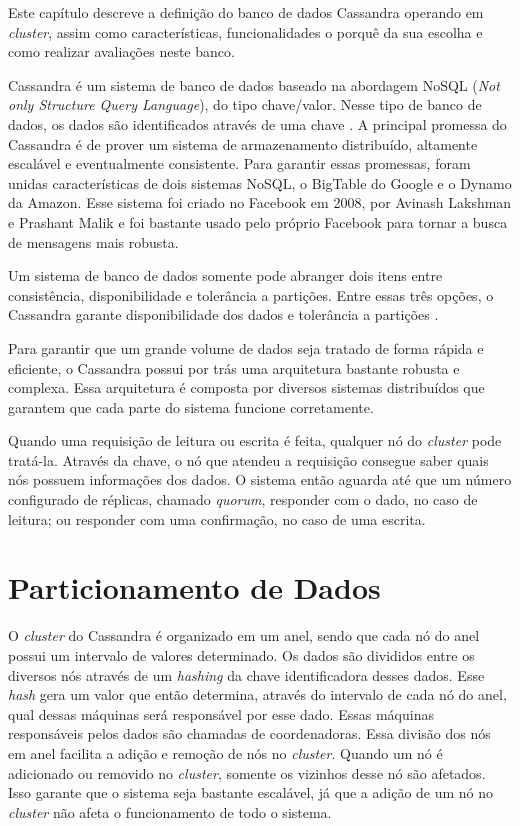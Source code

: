 Este capítulo descreve a definição do banco de dados Cassandra operando em \textit{cluster}, assim como características, funcionalidades o porquê da sua escolha e como realizar avaliações neste banco. 

Cassandra é um sistema de banco de dados baseado na abordagem NoSQL (\textit{Not only Structure Query Language}), do tipo chave/valor. Nesse tipo de banco de dados, os dados são identificados através de uma chave \cite{Silva}.
A principal promessa do Cassandra é de prover um sistema de armazenamento distribuído, altamente escalável e eventualmente consistente. Para garantir essas promessas,
foram unidas características de dois sistemas NoSQL, o BigTable do Google e o Dynamo da Amazon.
Esse sistema foi criado no Facebook em 2008, por Avinash Lakshman e Prashant Malik e foi bastante usado pelo próprio Facebook para tornar a busca de mensagens mais robusta. 


Um sistema de banco de dados somente pode abranger dois itens entre consistência, disponibilidade e tolerância a partições. Entre essas três
opções, o Cassandra garante disponibilidade dos dados e tolerância a partições \cite{Silva}.

Para garantir que um grande volume de dados seja tratado de forma rápida e eficiente, o Cassandra possui por trás uma arquitetura bastante robusta e complexa. Essa arquitetura é composta por diversos sistemas distribuídos que garantem que cada parte do sistema funcione corretamente.

Quando uma requisição de leitura ou escrita é feita, qualquer nó do \textit{cluster} pode tratá-la. Através da chave, o nó que atendeu a requisição consegue saber quais nós possuem informações dos dados. O sistema então aguarda até que um número configurado de réplicas, chamado \textit{quorum}, responder com o dado, no caso de leitura; ou responder com uma confirmação, no caso de uma escrita.

\section{Particionamento de Dados}
O \textit{cluster} do Cassandra é organizado em um anel, sendo que cada nó do anel possui um intervalo de valores determinado. Os dados são divididos entre os diversos nós através de um \textit{hashing} da chave identificadora desses dados. Esse \textit{hash} gera um valor que então determina, através do intervalo de cada nó do anel, qual dessas máquinas será responsável por esse dado. Essas máquinas responsáveis pelos dados são chamadas de coordenadoras.
Essa divisão dos nós em anel facilita a adição e remoção de nós no \textit{cluster}. Quando um nó é adicionado ou removido no \textit{cluster}, somente os vizinhos desse nó são afetados. Isso garante que o sistema seja bastante escalável, já que a adição de um nó no \textit{cluster} não afeta o funcionamento de todo o sistema.

